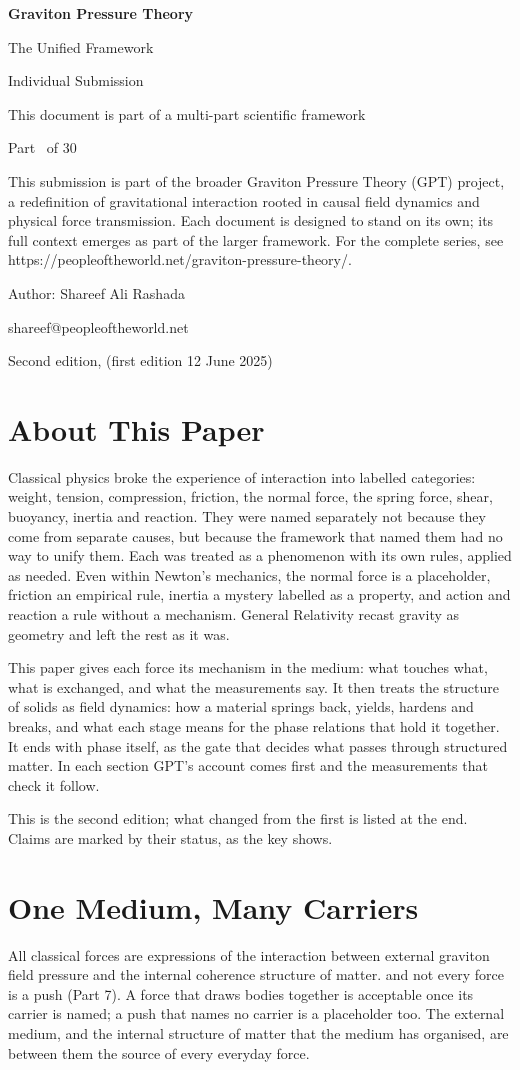 \documentclass[11pt,a4paper]{article}
\makeatletter
\newcommand{\gptitle}{%
  \begin{titlepage}\centering
  \vspace*{3cm}
  {\Huge\bfseries Graviton Pressure Theory\par}\vspace{0.8cm}
  {\Large The Unified Framework\par}\vspace{0.2cm}
  {\large Individual Submission\par}\vspace{0.6cm}
  {\normalsize This document is part of a multi-part scientific framework\par}\vspace{2cm}
  {\normalsize Part \gptpart\ of 30\par}\vspace{0.8cm}
  {\huge\bfseries \gpttitle\par}\vspace{0.6cm}
  {\Large \gptsubtitle\par}\vspace{1.5cm}
  {\small\begin{minipage}{0.75\textwidth}\centering This submission is part of the broader Graviton Pressure Theory (GPT) project, a redefinition of gravitational interaction rooted in causal field dynamics and physical force transmission. Each document is designed to stand on its own; its full context emerges as part of the larger framework. For the complete series, see https://peopleoftheworld.net/graviton-pressure-theory/.\end{minipage}\par}
  \vfill
  {\large Author: Shareef Ali Rashada\par}\vspace{0.2cm}
  {\normalsize shareef@peopleoftheworld.net\par}\vspace{0.5cm}
  {\normalsize Second edition, \gptdate \quad (first edition 12 June 2025)\par}
  \end{titlepage}
  \setcounter{page}{1}\tableofcontents\clearpage}
\makeatother
\begin{document}
\gptitle

\section*{About This Paper}

Classical physics broke the experience of interaction into labelled categories: weight, tension, compression, friction, the normal force, the spring force, shear, buoyancy, inertia and reaction. They were named separately not because they come from separate causes, but because the framework that named them had no way to unify them. Each was treated as a phenomenon with its own rules, applied as needed. Even within Newton's mechanics, the normal force is a placeholder, friction an empirical rule, inertia a mystery labelled as a property, and action and reaction a rule without a mechanism. General Relativity recast gravity as geometry and left the rest as it was.

This paper gives each force its mechanism in the medium: what touches what, what is exchanged, and what the measurements say. It then treats the structure of solids as field dynamics: how a material springs back, yields, hardens and breaks, and what each stage means for the phase relations that hold it together. It ends with phase itself, as the gate that decides what passes through structured matter. In each section GPT's account comes first and the measurements that check it follow.

This is the second edition; what changed from the first is listed at the end. Claims are marked by their status, as the key shows.

\statuskey

\section{One Medium, Many Carriers}

All classical forces are expressions of the interaction between external graviton field pressure and the internal coherence structure of matter.  and not every force is a push (Part 7). A force that draws bodies together is acceptable once its carrier is named; a push that names no carrier is a placeholder too. The external medium, and the internal structure of matter that the medium has organised, are between them the source of every everyday force.
\end{document}
